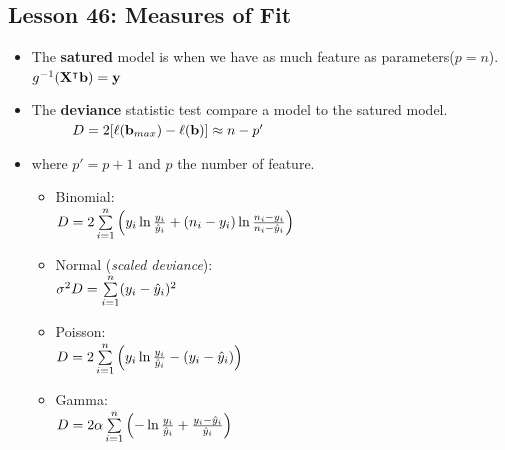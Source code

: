 \documentclass[10pt, french]{article}
\begin{document}
\begin{multicols*}{3}
\section*{Lesson 46: Measures of Fit}
\begin{itemize}[align=left,leftmargin=*]
  \item The \textbf{satured} model is when we have as much feature as parameters($p=n$). $g^{-1}(\mathbf{X}^\intercal\mathbf{b}) = \mathbf{y}$
  \item The \textbf{deviance} statistic test compare a model to the satured model. \\
  $\hspace*{1cm} D = 2[\ell(\mathbf{b}_{max}) - \ell(\mathbf{b})] \approx n - p'$
  \item[] where $p'=p+1$ and $p$ the number of feature.
  \begin{itemize}
    \item Binomial:\\
    $D = 2 \sum\limits_{i=1}^n \left(y_i \ln \frac{y_i}{\hat{y}_i} + (n_i - y_i)\ln \frac{n_i - y_i}{n_i - \hat{y}_i} \right)$
    \item Normal (\emph{scaled deviance}): \\
    $\sigma^2 D = \sum\limits_{i=1}^n (y_i - \hat{y}_i)^2$
    \item Poisson: \\
    $D = 2\sum\limits_{i=1}^n \left(y_i \ln \frac{y_i}{\hat{y}_i} - (y_i - \hat{y}_i) \right)$
    \item Gamma: \\
    $D = 2 \alpha \sum\limits_{i=1}^n \left(-\ln \frac{y_i}{\hat{y}_i} + \frac{y_i - \hat{y}_i}{\hat{y}_i} \right)$
  \end{itemize}
\end{itemize}
\columnbreak

\end{multicols*}
\end{document}
